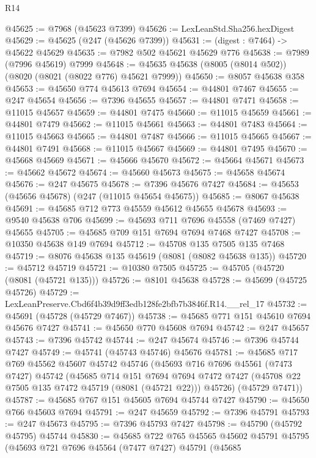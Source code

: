 \begin{lexlean}{R14}
\begin{coremodule}
@45625 := @7968 (@45623 @7399)
@45626 := LexLeanStd.Sha256.hexDigest
@45629 := @45625 (@247 (@45626 @7399))
@45631 := (digest : @7464) -> @45622 @45629
@45635 := @7982 @502 @45621 @45629 @776
@45638 := @7989 (@7996 @45619) @7999
@45648 := @45635 @45638 (@8005 (@8014 @502)) (@8020 (@8021 (@8022 @776) @45621 @7999))
@45650 := @8057 @45638 @358
@45653 := @45650 @774 @45613 @7694
@45654 := @44801 @7467
@45655 := @247 @45654
@45656 := @7396 @45655
@45657 := @44801 @7471
@45658 := @11015 @45657
@45659 := @44801 @7475
@45660 := @11015 @45659
@45661 := @44801 @7479
@45662 := @11015 @45661
@45663 := @44801 @7483
@45664 := @11015 @45663
@45665 := @44801 @7487
@45666 := @11015 @45665
@45667 := @44801 @7491
@45668 := @11015 @45667
@45669 := @44801 @7495
@45670 := @45668 @45669
@45671 := @45666 @45670
@45672 := @45664 @45671
@45673 := @45662 @45672
@45674 := @45660 @45673
@45675 := @45658 @45674
@45676 := @247 @45675
@45678 := @7396 @45676 @7427
@45684 := @45653 (@45656 @45678) (@247 (@11015 @45654 @45675))
@45685 := @8067 @45638
@45691 := @45685 @712 @773 @45559 @45612 @45655 @45678
@45693 := @9540 @45638 @706
@45699 := @45693 @711 @7696 @45558 (@7469 @7427) @45655
@45705 := @45685 @709 @151 @7694 @7694 @7468 @7427
@45708 := @10350 @45638 @149 @7694
@45712 := @45708 @135 @7505 @135 @7468
@45719 := @8076 @45638 @135 @45619 (@8081 (@8082 @45638 @135))
@45720 := @45712 @45719
@45721 := @10380 @7505
@45725 := @45705 (@45720 (@8081 (@45721 @135)))
@45726 := @8101 @45638
@45728 := @45699 (@45725 @45726)
@45729 := LexLeanPreserve.Cbd6f4b39d9ff3edb128fe2bfb7b3846f.R14.__rel_17
@45732 := @45691 (@45728 (@45729 @7467))
@45738 := @45685 @771 @151 @45610 @7694 @45676 @7427
@45741 := @45650 @770 @45608 @7694
@45742 := @247 @45657
@45743 := @7396 @45742
@45744 := @247 @45674
@45746 := @7396 @45744 @7427
@45749 := @45741 (@45743 @45746) @45676
@45781 := @45685
    @717
    @769
    @45562
    @45607
    @45742
    @45746
    (@45693
      @716
      @7696
      @45561
      (@7473 @7427)
      @45742
      (@45685
        @714
        @151
        @7694
        @7694
        @7472
        @7427
        (@45708 @22 @7505 @135 @7472 @45719 (@8081 (@45721 @22)))
        @45726)
      (@45729 @7471))
@45787 := @45685 @767 @151 @45605 @7694 @45744 @7427
@45790 := @45650 @766 @45603 @7694
@45791 := @247 @45659
@45792 := @7396 @45791
@45793 := @247 @45673
@45795 := @7396 @45793 @7427
@45798 := @45790 (@45792 @45795) @45744
@45830 := @45685
    @722
    @765
    @45565
    @45602
    @45791
    @45795
    (@45693
      @721
      @7696
      @45564
      (@7477 @7427)
      @45791
      (@45685

\end{coremodule}
\end{lexlean}
